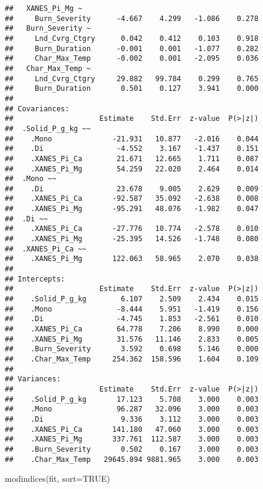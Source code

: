 \documentclass[
]{article}
\newenvironment{Shaded}{\begin{snugshade}}{\end{snugshade}}
\newcommand{\AttributeTok}[1]{\textcolor[rgb]{0.77,0.63,0.00}{#1}}
\newcommand{\ConstantTok}[1]{\textcolor[rgb]{0.00,0.00,0.00}{#1}}
\newcommand{\FunctionTok}[1]{\textcolor[rgb]{0.00,0.00,0.00}{#1}}
\newcommand{\NormalTok}[1]{#1}
\begin{document}
\begin{verbatim}
##   XANES_Pi_Mg ~                                         
##     Burn_Severity      -4.667    4.299   -1.086    0.278
##   Burn_Severity ~                                       
##     Lnd_Cvrg_Ctgry      0.042    0.412    0.103    0.918
##     Burn_Duration      -0.001    0.001   -1.077    0.282
##     Char_Max_Temp      -0.002    0.001   -2.095    0.036
##   Char_Max_Temp ~                                       
##     Lnd_Cvrg_Ctgry     29.882   99.784    0.299    0.765
##     Burn_Duration       0.501    0.127    3.941    0.000
## 
## Covariances:
##                    Estimate    Std.Err  z-value  P(>|z|)
##  .Solid_P_g_kg ~~                                       
##    .Mono              -21.931   10.877   -2.016    0.044
##    .Di                 -4.552    3.167   -1.437    0.151
##    .XANES_Pi_Ca        21.671   12.665    1.711    0.087
##    .XANES_Pi_Mg        54.259   22.020    2.464    0.014
##  .Mono ~~                                               
##    .Di                 23.678    9.005    2.629    0.009
##    .XANES_Pi_Ca       -92.587   35.092   -2.638    0.008
##    .XANES_Pi_Mg       -95.291   48.076   -1.982    0.047
##  .Di ~~                                                 
##    .XANES_Pi_Ca       -27.776   10.774   -2.578    0.010
##    .XANES_Pi_Mg       -25.395   14.526   -1.748    0.080
##  .XANES_Pi_Ca ~~                                        
##    .XANES_Pi_Mg       122.063   58.965    2.070    0.038
## 
## Intercepts:
##                    Estimate    Std.Err  z-value  P(>|z|)
##    .Solid_P_g_kg        6.107    2.509    2.434    0.015
##    .Mono               -8.444    5.951   -1.419    0.156
##    .Di                 -4.745    1.853   -2.561    0.010
##    .XANES_Pi_Ca        64.778    7.206    8.990    0.000
##    .XANES_Pi_Mg        31.576   11.146    2.833    0.005
##    .Burn_Severity       3.592    0.698    5.146    0.000
##    .Char_Max_Temp     254.362  158.596    1.604    0.109
## 
## Variances:
##                    Estimate    Std.Err  z-value  P(>|z|)
##    .Solid_P_g_kg       17.123    5.708    3.000    0.003
##    .Mono               96.287   32.096    3.000    0.003
##    .Di                  9.336    3.112    3.000    0.003
##    .XANES_Pi_Ca       141.180   47.060    3.000    0.003
##    .XANES_Pi_Mg       337.761  112.587    3.000    0.003
##    .Burn_Severity       0.502    0.167    3.000    0.003
##    .Char_Max_Temp   29645.894 9881.965    3.000    0.003
\end{verbatim}

\begin{Shaded}
\begin{Highlighting}[]
\FunctionTok{modindices}\NormalTok{(fit, }\AttributeTok{sort=}\ConstantTok{TRUE}\NormalTok{)}
\end{Highlighting}
\end{Shaded}
\end{document}
